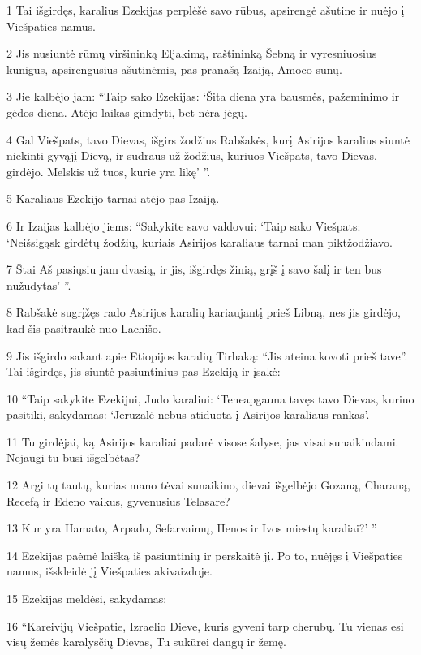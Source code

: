 \par 1 Tai išgirdęs, karalius Ezekijas perplėšė savo rūbus, apsirengė ašutine ir nuėjo į Viešpaties namus. 
\par 2 Jis nusiuntė rūmų viršininką Eljakimą, raštininką Šebną ir vyresniuosius kunigus, apsirengusius ašutinėmis, pas pranašą Izaiją, Amoco sūnų. 
\par 3 Jie kalbėjo jam: “Taip sako Ezekijas: ‘Šita diena yra bausmės, pažeminimo ir gėdos diena. Atėjo laikas gimdyti, bet nėra jėgų. 
\par 4 Gal Viešpats, tavo Dievas, išgirs žodžius Rabšakės, kurį Asirijos karalius siuntė niekinti gyvąjį Dievą, ir sudraus už žodžius, kuriuos Viešpats, tavo Dievas, girdėjo. Melskis už tuos, kurie yra likę’ ”. 
\par 5 Karaliaus Ezekijo tarnai atėjo pas Izaiją. 
\par 6 Ir Izaijas kalbėjo jiems: “Sakykite savo valdovui: ‘Taip sako Viešpats: ‘Neišsigąsk girdėtų žodžių, kuriais Asirijos karaliaus tarnai man piktžodžiavo. 
\par 7 Štai Aš pasiųsiu jam dvasią, ir jis, išgirdęs žinią, grįš į savo šalį ir ten bus nužudytas’ ”. 
\par 8 Rabšakė sugrįžęs rado Asirijos karalių kariaujantį prieš Libną, nes jis girdėjo, kad šis pasitraukė nuo Lachišo. 
\par 9 Jis išgirdo sakant apie Etiopijos karalių Tirhaką: “Jis ateina kovoti prieš tave”. Tai išgirdęs, jis siuntė pasiuntinius pas Ezekiją ir įsakė: 
\par 10 “Taip sakykite Ezekijui, Judo karaliui: ‘Teneapgauna tavęs tavo Dievas, kuriuo pasitiki, sakydamas: ‘Jeruzalė nebus atiduota į Asirijos karaliaus rankas’. 
\par 11 Tu girdėjai, ką Asirijos karaliai padarė visose šalyse, jas visai sunaikindami. Nejaugi tu būsi išgelbėtas? 
\par 12 Argi tų tautų, kurias mano tėvai sunaikino, dievai išgelbėjo Gozaną, Charaną, Recefą ir Edeno vaikus, gyvenusius Telasare? 
\par 13 Kur yra Hamato, Arpado, Sefarvaimų, Henos ir Ivos miestų karaliai?’ ” 
\par 14 Ezekijas paėmė laišką iš pasiuntinių ir perskaitė jį. Po to, nuėjęs į Viešpaties namus, išskleidė jį Viešpaties akivaizdoje. 
\par 15 Ezekijas meldėsi, sakydamas: 
\par 16 “Kareivijų Viešpatie, Izraelio Dieve, kuris gyveni tarp cherubų. Tu vienas esi visų žemės karalysčių Dievas, Tu sukūrei dangų ir žemę. 
